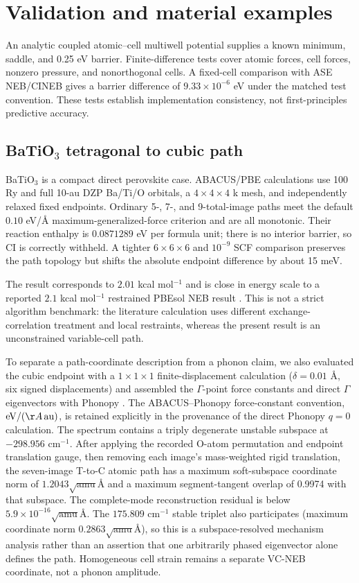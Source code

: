 \documentclass[final,3p,times]{elsarticle}
\begin{document}
\section{Validation and material examples}
\label{sec:results}

An analytic coupled atomic--cell multiwell potential supplies a known minimum,
saddle, and 0.25 eV barrier. Finite-difference tests cover atomic forces, cell
forces, nonzero pressure, and nonorthogonal cells. A fixed-cell comparison with
ASE NEB/CINEB gives a barrier difference of $9.33\times10^{-6}$ eV under the
matched test convention. These tests establish implementation consistency, not
first-principles predictive accuracy.

\subsection{BaTiO$_3$ tetragonal to cubic path}

BaTiO$_3$ is a compact direct perovskite case. ABACUS/PBE calculations use
100 Ry and full 10-au DZP Ba/Ti/O orbitals, a $4\times4\times4$ k mesh, and
independently relaxed fixed endpoints. Ordinary 5-, 7-, and 9-total-image paths
meet the default $0.10$ eV/\AA{} maximum-generalized-force criterion and are
all monotonic.
Their reaction enthalpy is $0.0871289$ eV per formula unit; there is no interior
barrier, so CI is correctly withheld. A tighter $6\times6\times6$ and $10^{-9}$
SCF comparison preserves the path topology but shifts the absolute endpoint
difference by about 15 meV.

The result corresponds to $2.01$ kcal mol$^{-1}$ and is close in energy scale
to a reported $2.1$ kcal mol$^{-1}$ restrained PBEsol NEB result
\cite{BTOReaxFF2019}. This is not a strict algorithm benchmark: the literature
calculation uses different exchange-correlation treatment and local restraints,
whereas the present result is an unconstrained variable-cell path.

To separate a path-coordinate description from a phonon claim, we also evaluated
the cubic endpoint with a $1\times1\times1$ finite-displacement calculation
($\delta=0.01$ \AA{}, six signed displacements) and assembled the $\Gamma$-point
force constants and direct $\Gamma$ eigenvectors with Phonopy \cite{Togo2015}.
The ABACUS--Phonopy force-constant convention,
$\mathrm{eV}/(\AA\,\mathrm{au})$, is retained explicitly in the provenance
of the direct Phonopy $q=0$ calculation. The spectrum contains a triply degenerate unstable
subspace at $-298.956$ cm$^{-1}$. After applying the
recorded O-atom permutation and endpoint translation gauge, then removing each
image's mass-weighted rigid translation, the seven-image T-to-C atomic path has
a maximum soft-subspace coordinate norm of $1.2043\sqrt{\mathrm{amu}}$\AA{} and
a maximum segment-tangent overlap of 0.9974 with that subspace. The complete-mode
reconstruction residual is below $5.9\times10^{-16}\sqrt{\mathrm{amu}}$\AA{}.
The $175.809$ cm$^{-1}$ stable triplet also participates (maximum coordinate norm
$0.2863\sqrt{\mathrm{amu}}$\AA{}), so this is a subspace-resolved mechanism
analysis rather than an assertion that one arbitrarily phased eigenvector alone
defines the path. Homogeneous cell strain remains a separate VC-NEB coordinate,
not a phonon amplitude.
\end{document}
